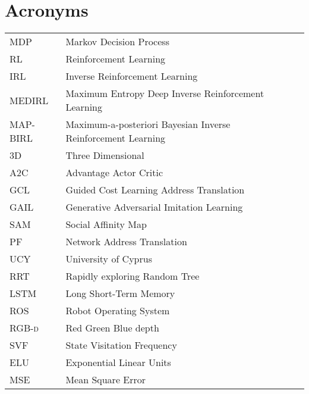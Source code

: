 
\chapter*{{\huge\rm\bfseries{Acronyms}}}

\scriptsize
\begin{table}[!h]
\vspace{-2.0cm}
\hspace{1.0cm}
\begin{tabular}{l l r}

\textsc{MDP}  &  Markov Decision Process\\ [2ex]
\textsc{RL}  &  Reinforcement Learning \\ [2ex]
\textsc{IRL}  &  Inverse Reinforcement Learning \\ [2ex]
\textsc{MEDIRL}  &  Maximum Entropy Deep Inverse Reinforcement Learning\\ [2ex]
\textsc{MAP-BIRL}  &  Maximum-a-posteriori Bayesian Inverse Reinforcement Learning\\ [2ex]
\textsc{3D}  &  Three Dimensional\\ [2ex]
\textsc{A2C}  &  Advantage Actor Critic \\ [2ex]
\textsc{GCL}  &  Guided Cost Learning Address Translation \\ [2ex]
\textsc{GAIL}  &  Generative Adversarial Imitation Learning \\ [2ex]
\textsc{SAM}  &  Social Affinity Map \\ [2ex]
\textsc{PF}  &  Network Address Translation \\ [2ex]
\textsc{UCY}  &  University of Cyprus \\ [2ex]
\textsc{RRT}  &  Rapidly exploring Random Tree\\ [2ex]
\textsc{LSTM}  &  Long Short-Term Memory\\ [2ex]
\textsc{ROS}  &  Robot Operating System\\ [2ex]
\textsc{RGB-d}  &  Red Green Blue depth\\ [2ex]

\textsc{SVF}  &  State Visitation Frequency\\ [2ex]
\textsc{ELU}  &  Exponential Linear Units\\ [2ex]
\textsc{MSE}  &  Mean Square Error\\ [2ex]
\end{tabular}
\end{table}










